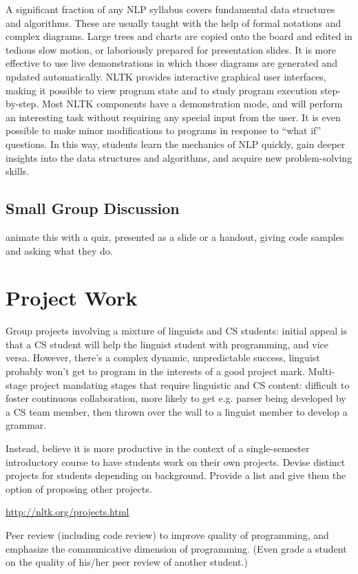 \documentclass[11pt]{article}
\begin{document}
A significant fraction of any NLP syllabus covers fundamental data
structures and algorithms. These are usually taught with the help of
formal notations and complex diagrams. Large trees and charts are
copied onto the board and edited in tedious slow motion, or
laboriously prepared for presentation slides. It is more effective to
use live demonstrations in which those diagrams are generated and
updated automatically. NLTK provides interactive graphical user
interfaces, making it possible to view program state and to study
program execution step-by-step. Most NLTK components have a
demonstration mode, and will perform an interesting task without
requiring any special input from the user. It is even possible to make
minor modifications to programs in response to ``what if'' questions. In
this way, students learn the mechanics of NLP quickly, gain deeper
insights into the data structures and algorithms, and acquire new
problem-solving skills.

\subsection{Small Group Discussion}

animate this with a quiz, presented as a slide or a handout, giving code samples and asking what they do.

\section{Project Work}

Group projects involving a mixture of linguists and CS students:
initial appeal is that a CS student will help the linguist student with programming,
and vice versa.  However, there's a
complex dynamic, unpredictable success, linguist probably won't get to program
in the interests of a good project mark.
Multi-stage project mandating stages that require linguistic and CS content: difficult
to foster continuous collaboration, more likely to get e.g. parser being developed by
a CS team member, then thrown over the wall to a linguist member to develop a grammar.

Instead, believe it is more productive in the context of a single-semester introductory
course to have students work on their own projects.  Devise distinct projects for
students depending on background.  Provide a list and give them the option of proposing
other projects.

\url{http://nltk.org/projects.html}

Peer review (including code review) to improve quality of programming, and
emphasize the communicative dimension of programming.
(Even grade a student on the quality of his/her peer review of another student.)






\end{document}
